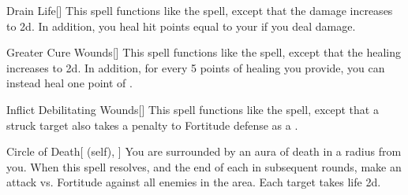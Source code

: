 \lowercase{\hypertarget{spell:Drain Life}{}}\label{spell:Drain Life}
\begin{freeability}[\nth{3}]{\hypertarget{spell:Drain Life}{Drain Life}}[]
This spell functions like the  spell, except that the damage increases to  \plus2d.
In addition, you heal hit points equal to your  if you deal damage.
\end{freeability}
\vspace{0.25em}



\lowercase{\hypertarget{spell:Greater Cure Wounds}{}}\label{spell:Greater Cure Wounds}
\begin{freeability}[\nth{3}]{\hypertarget{spell:Greater Cure Wounds}{Greater Cure Wounds}}[]
This spell functions like the  spell, except that the healing increases to  \plus2d.
In addition, for every 5 points of healing you provide, you can instead heal one point of .
\end{freeability}
\vspace{0.25em}



\lowercase{\hypertarget{spell:Inflict Debilitating Wounds}{}}\label{spell:Inflict Debilitating Wounds}
\begin{freeability}[\nth{3}]{\hypertarget{spell:Inflict Debilitating Wounds}{Inflict Debilitating Wounds}}[]
This spell functions like the  spell, except that a struck target also takes a  penalty to Fortitude defense as a .
\end{freeability}
\vspace{0.25em}



\lowercase{\hypertarget{spell:Circle of Death}{}}\label{spell:Circle of Death}
\begin{attuneability}[\nth{4}]{\hypertarget{spell:Circle of Death}{Circle of Death}}[ (self), ]
You are surrounded by an aura of death in a \areamed radius  from you.
When this spell resolves, and the end of each  in subsequent rounds, make an attack vs. Fortitude against all enemies in the area.
\hit Each target takes life  \minus2d.
\end{attuneability}
\vspace{0.25em}



